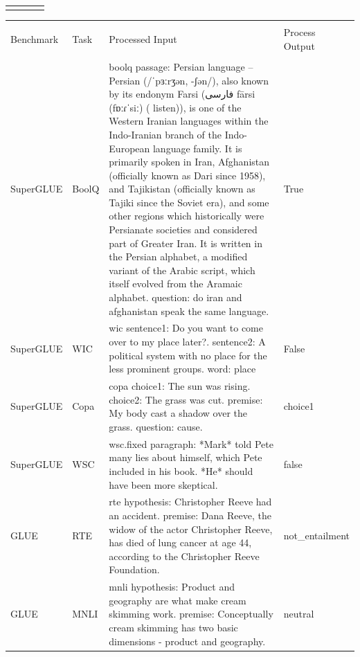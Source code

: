\documentclass[final,6p,times,twocolumn,authoryear]{elsarticle}
\begin{document}
\begin{table}[!htbp]
\begin{tabularx}{\textwidth}{l l X l}
    \hline 
    \hline \\[-1.8ex] 
    \end{tabularx}
    \label{data_prep} 
\end{table}


\begin{table}[!htbp]
    \centering
    \begin{tabularx}{\textwidth}{l l X l} 
        \\[-1.8ex]\hline 
        \hline \\
        Benchmark & Task & Processed Input & Process Output \\ 
        \hline \\[-1.8ex]
        SuperGLUE & BoolQ & boolq  passage: Persian language -- Persian (/ˈpɜːrʒən, -ʃən/), also known by its endonym Farsi (فارسی fārsi (fɒːɾˈsiː) ( listen)), is one of the Western Iranian languages within the Indo-Iranian branch of the Indo-European language family. It is primarily spoken in Iran, Afghanistan (officially known as Dari since 1958), and Tajikistan (officially known as Tajiki since the Soviet era), and some other regions which historically were Persianate societies and considered part of Greater Iran. It is written in the Persian alphabet, a modified variant of the Arabic script, which itself evolved from the Aramaic alphabet. question: do iran and afghanistan speak the same language. & True \\
        SuperGLUE & WIC & wic sentence1: Do you want to come over to my place later?. sentence2: A political system with no place for the less prominent groups. word: place & False \\
        SuperGLUE & Copa & copa choice1: The sun was rising. choice2: The grass was cut. premise: My body cast a shadow over the grass. question: cause. & choice1 \\
        SuperGLUE & WSC & wsc.fixed paragraph: *Mark* told Pete many lies about himself, which Pete included in his book. *He* should have been more skeptical. & false \\
        GLUE & RTE & rte hypothesis: Christopher Reeve had an accident. premise: Dana Reeve, the widow of the actor Christopher Reeve, has died of lung cancer at age 44, according to the Christopher Reeve Foundation. & not\_entailment \\
        GLUE & MNLI & mnli hypothesis: Product and geography are what make cream skimming work. premise: Conceptually cream skimming has two basic dimensions - product and geography. & neutral \\

\end{tabularx}
\end{table}
\end{document}
